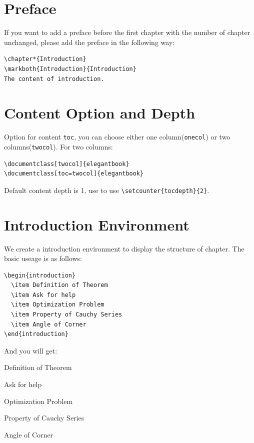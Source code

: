 \documentclass[11pt,bibtex]{elegantbook}
\begin{document}
\section{Preface}

If you want to add a preface before the first chapter with the number of chapter unchanged, please add the preface in the following way:
\begin{lstlisting}
\chapter*{Introduction}
\markboth{Introduction}{Introduction}
The content of introduction.
\end{lstlisting}

\section{Content Option and Depth}
Option for content \lstinline{toc}, you can  choose either one column(\lstinline{onecol}) or two columns(\lstinline{twocol}). For two columns:
\begin{lstlisting}
\documentclass[twocol]{elegantbook}
\documentclass[toc=twocol]{elegantbook}
\end{lstlisting}

Default content depth is 1, use to use \lstinline|\setcounter{tocdepth}{2}|.

\section{Introduction Environment}
We create a introduction environment to display the structure of chapter. The basic useage is as follows:
\begin{lstlisting}
\begin{introduction}
  \item Definition of Theorem
  \item Ask for help
  \item Optimization Problem
  \item Property of Cauchy Series
  \item Angle of Corner
\end{introduction}
\end{lstlisting}
And you will get:
\begin{introduction}
  \item Definition of Theorem
  \item Ask for help
  \item Optimization Problem
  \item Property of Cauchy Series
  \item Angle of Corner
\end{introduction}
\end{document}
